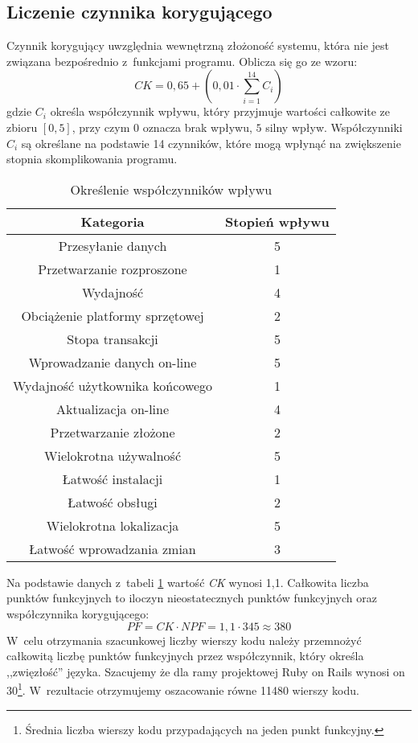 \documentclass[12pt,leqno,twoside]{mwart}
\begin{document}
\subsection{Liczenie czynnika korygującego}
\noindent Czynnik korygujący uwzględnia wewnętrzną złożoność systemu, która nie jest związana bezpośrednio z~funkcjami programu. Oblicza się go ze wzoru:
\begin{displaymath}
CK = 0,65 + (0,01 \cdot \sum_{i=1}^{14} C_i)
\end{displaymath}
gdzie $C_i$ określa współczynnik wpływu, który przyjmuje wartości całkowite ze zbioru $[0,5]$, przy czym $0$ oznacza brak wpływu, $5$ silny wpływ. Współczynniki $C_i$ są określane na podstawie 14 czynników, które mogą wpłynąć na zwiększenie stopnia skomplikowania programu.
\begin{table}[h]
	\centering
	\caption{Określenie współczynników wpływu}
		\renewcommand{\arraystretch}{1.2}
		\rule{0pt}{3ex}
		\begin{tabular}{|c|c|}
		\hline
		\textbf{Kategoria}				& \textbf{Stopień wpływu} \\ \hline
		Przesyłanie danych 				& 5\\ \hline
		Przetwarzanie rozproszone 		& 1\\ \hline
		Wydajność 						& 4\\ \hline
		Obciążenie platformy sprzętowej & 2\\ \hline
		Stopa transakcji 				& 5\\ \hline
		Wprowadzanie danych on-line 	& 5\\ \hline
		Wydajność użytkownika końcowego & 1\\ \hline
		Aktualizacja on-line 			& 4\\ \hline
		Przetwarzanie złożone 			& 2\\ \hline
		Wielokrotna używalność 			& 5\\ \hline
		Łatwość instalacji 				& 1\\ \hline
		Łatwość obsługi					& 2\\ \hline
		Wielokrotna lokalizacja 		& 5\\ \hline
		Łatwość wprowadzania zmian 		& 3\\ \hline
		\end{tabular}
	\label{wsp_wplywu}
\end{table}

Na podstawie danych z~tabeli \ref{wsp_wplywu} wartość \textit{CK} wynosi 1,1. Całkowita liczba punktów funkcyjnych to iloczyn nieostatecznych punktów funkcyjnych oraz współczynnika korygującego:
\begin{displaymath}
PF = CK \cdot NPF = 1,1 \cdot 345 \approx 380
\end{displaymath}
W~celu otrzymania szacunkowej liczby wierszy kodu należy przemnożyć całkowitą liczbę punktów funkcyjnych przez współczynnik, który określa ,,zwięzłość'' języka. Szacujemy że dla ramy projektowej Ruby on Rails wynosi on 30\footnote{Średnia liczba wierszy kodu przypadających na jeden punkt funkcyjny.}. W~rezultacie otrzymujemy oszacowanie równe 11480 wierszy kodu.
\end{document}
